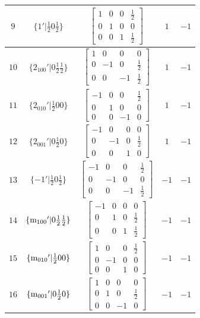 \documentclass[fleqn,8pt]{jsarticle}
\begin{document}
\begin{longtable}{ccccc}
$ 9 $ & $ \{1{}'|\frac{1}{2} 0 \frac{1}{2}\} $ & $ \begin{bmatrix} 1 & 0 & 0 & \frac{1}{2} \\ 0 & 1 & 0 & 0 \\ 0 & 0 & 1 & \frac{1}{2} \end{bmatrix} $ & $ 1 $ & $ -1 $ \\ \hline
$ 10 $ & $ \{2{}_{100}{}'|0 \frac{1}{2} \frac{1}{2}\} $ & $ \begin{bmatrix} 1 & 0 & 0 & 0 \\ 0 & -1 & 0 & \frac{1}{2} \\ 0 & 0 & -1 & \frac{1}{2} \end{bmatrix} $ & $ 1 $ & $ -1 $ \\ \hline
$ 11 $ & $ \{2{}_{010}{}'|\frac{1}{2} 0 0\} $ & $ \begin{bmatrix} -1 & 0 & 0 & \frac{1}{2} \\ 0 & 1 & 0 & 0 \\ 0 & 0 & -1 & 0 \end{bmatrix} $ & $ 1 $ & $ -1 $ \\ \hline
$ 12 $ & $ \{2{}_{001}{}'|0 \frac{1}{2} 0\} $ & $ \begin{bmatrix} -1 & 0 & 0 & 0 \\ 0 & -1 & 0 & \frac{1}{2} \\ 0 & 0 & 1 & 0 \end{bmatrix} $ & $ 1 $ & $ -1 $ \\ \hline
$ 13 $ & $ \{-1{}'|\frac{1}{2} 0 \frac{1}{2}\} $ & $ \begin{bmatrix} -1 & 0 & 0 & \frac{1}{2} \\ 0 & -1 & 0 & 0 \\ 0 & 0 & -1 & \frac{1}{2} \end{bmatrix} $ & $ -1 $ & $ -1 $ \\ \hline
$ 14 $ & $ \{{\rm m}_{100}{}'|0 \frac{1}{2} \frac{1}{2}\} $ & $ \begin{bmatrix} -1 & 0 & 0 & 0 \\ 0 & 1 & 0 & \frac{1}{2} \\ 0 & 0 & 1 & \frac{1}{2} \end{bmatrix} $ & $ -1 $ & $ -1 $ \\ \hline
$ 15 $ & $ \{{\rm m}_{010}{}'|\frac{1}{2} 0 0\} $ & $ \begin{bmatrix} 1 & 0 & 0 & \frac{1}{2} \\ 0 & -1 & 0 & 0 \\ 0 & 0 & 1 & 0 \end{bmatrix} $ & $ -1 $ & $ -1 $ \\ \hline
$ 16 $ & $ \{{\rm m}_{001}{}'|0 \frac{1}{2} 0\} $ & $ \begin{bmatrix} 1 & 0 & 0 & 0 \\ 0 & 1 & 0 & \frac{1}{2} \\ 0 & 0 & -1 & 0 \end{bmatrix} $ & $ -1 $ & $ -1 $ \\
\end{longtable}
\end{document}
